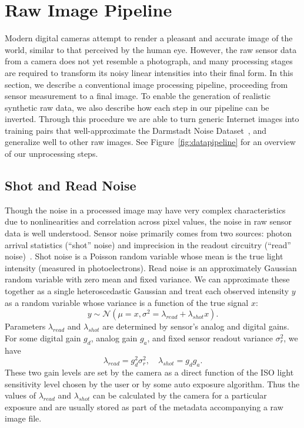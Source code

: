 \documentclass[10pt,twocolumn,letterpaper]{article}
\newcommand{\noise}{\lambda}
\newcommand{\shotnoise}{\noise_{\mathit{shot}}}
\newcommand{\readnoise}{\noise_{\mathit{read}}}
\begin{document}
\section{Raw Image Pipeline}
\label{sec:image_formation_pipeline}

Modern digital cameras attempt to render a pleasant and accurate image of the world, similar to that perceived by the human eye. However, the raw sensor data from a camera does not yet resemble a photograph, and many processing stages are required to transform its noisy linear intensities into their final form. In this section, we describe a conventional image processing pipeline, proceeding from sensor measurement to a final image. To enable the generation of realistic synthetic raw data, we also describe how each step in our pipeline can be inverted. Through this procedure we are able to turn generic Internet images into training pairs that well-approximate the Darmstadt Noise Dataset~\cite{plotz2017cvpr}, and generalize well to other raw images.
See Figure~\ref{fig:datapipeline} for an overview of our unprocessing steps.

\subsection{Shot and Read Noise}
\label{sec:noise}

Though the noise in a processed image may have very complex characteristics due to nonlinearities and correlation across pixel values, the noise in raw sensor data is well understood.
Sensor noise primarily comes from two sources: photon arrival statistics (``shot'' noise) and imprecision in the readout circuitry (``read'' noise)~\cite{Hasinoff2014}. Shot noise is a Poisson random variable whose mean is the true light intensity (measured in photoelectrons). Read noise is an approximately Gaussian random variable with zero mean and fixed variance. We can approximate these together as a single heteroscedastic Gaussian and treat each observed intensity $y$ as a random variable whose variance is a function of the true signal $x$:
\begin{equation}
y \sim \mathcal N(\mu=x, \sigma^2=\readnoise + \shotnoise x).
\end{equation}
Parameters $\readnoise$ and $\shotnoise$ are determined by sensor's analog and digital gains. For some digital gain $g_d$, analog gain $g_a$, and fixed sensor readout variance $\sigma_r^2$, we have
\begin{equation}
\readnoise = g_d^2 \sigma_r^2,\quad \shotnoise = g_d g_a.
\end{equation}
These two gain levels are set by the camera as a direct function of the ISO light sensitivity level chosen by the user or by some auto exposure algorithm. Thus the values of $\readnoise$ and $\shotnoise$ can be calculated by the camera for a particular exposure and are usually stored as part of the metadata accompanying a raw image file.
\end{document}
